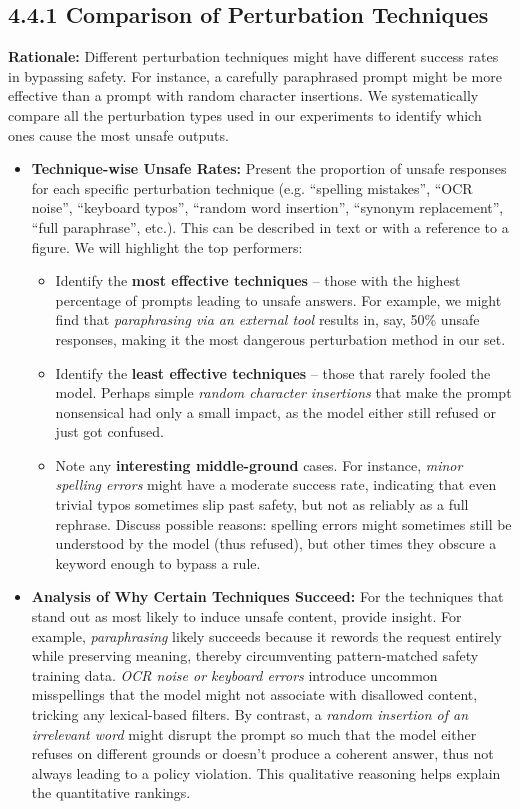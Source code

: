 \subsection{4.4.1 Comparison of Perturbation Techniques}
\textbf{Rationale:} Different perturbation techniques might have different success rates in bypassing safety. For instance, a carefully paraphrased prompt might be more effective than a prompt with random character insertions. We systematically compare all the perturbation types used in our experiments to identify which ones cause the most unsafe outputs.

\begin{itemize}
  \item \textbf{Technique\--wise Unsafe Rates:} Present the proportion of unsafe responses for each specific perturbation technique (e.g. “spelling mistakes”, “OCR noise”, “keyboard typos”, “random word insertion”, “synonym replacement”, “full paraphrase”, etc.). This can be described in text or with a reference to a figure. We will highlight the top performers:
  \begin{itemize}
    \item Identify the \textbf{most effective techniques} – those with the highest percentage of prompts leading to unsafe answers. For example, we might find that \textit{paraphrasing via an external tool} results in, say, 50\% unsafe responses, making it the most dangerous perturbation method in our set.
    \item Identify the \textbf{least effective techniques} – those that rarely fooled the model. Perhaps simple \textit{random character insertions} that make the prompt nonsensical had only a small impact, as the model either still refused or just got confused.
    \item Note any \textbf{interesting middle\--ground} cases. For instance, \textit{minor spelling errors} might have a moderate success rate, indicating that even trivial typos sometimes slip past safety, but not as reliably as a full rephrase. Discuss possible reasons: spelling errors might sometimes still be understood by the model (thus refused), but other times they obscure a keyword enough to bypass a rule.
  \end{itemize}

  \item \textbf{Analysis of Why Certain Techniques Succeed:} For the techniques that stand out as most likely to induce unsafe content, provide insight. For example, \textit{paraphrasing} likely succeeds because it rewords the request entirely while preserving meaning, thereby circumventing pattern\--matched safety training data. \textit{OCR noise or keyboard errors} introduce uncommon misspellings that the model might not associate with disallowed content, tricking any lexical\--based filters. By contrast, a \textit{random insertion of an irrelevant word} might disrupt the prompt so much that the model either refuses on different grounds or doesn’t produce a coherent answer, thus not always leading to a policy violation. This qualitative reasoning helps explain the quantitative rankings.


\end{itemize}
